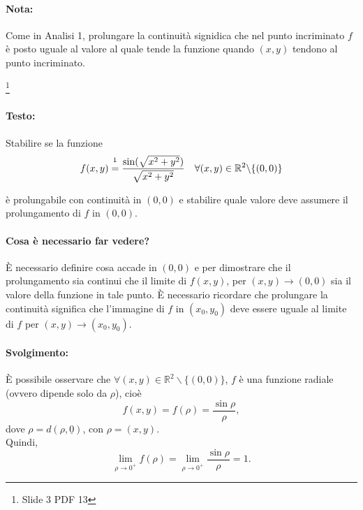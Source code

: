 \paragraph{Nota:} Come in Analisi 1, prolungare la continuità signidica che nel punto incriminato $f$ è posto uguale al valore al quale tende la funzione quando $(x, y)$ tendono al punto incriminato.

\begin{example}\footnote{Slide 3 PDF 13}
	\paragraph{Testo:} Stabilire se la funzione
	\begin{equation*}
		f(x,y) \overset{\footnotemark}{=} \frac{\sin(\sqrt{x^2+y^2})}{\sqrt{x^2+y^2}}\quad \forall(x,y)\in\mathbb{R}^2\backslash\{(0,0)\}
	\end{equation*}
	
	\noindent è prolungabile con continuità in $(0,0)$ e stabilire quale valore deve assumere il prolungamento di $f$ in $(0,0)$.
	\paragraph{Cosa è necessario far vedere?} È necessario definire cosa accade in $(0,0)$ e per dimostrare che il prolungamento sia continui che il limite di $f(x,y)$, per $(x,y)\rightarrow(0,0)$ sia il valore della funzione in tale punto. È necessario ricordare che prolungare la continuità significa che l'immagine di $f$ in $(x_0,y_0)$ deve essere uguale al limite di $f$ per $(x,y)\rightarrow(x_0,y_0)$.
	\paragraph{Svolgimento:} È possibile osservare che $\forall (x,y)\in\mathbb R^2\backslash\{(0,0)\}$, $f$ è una funzione radiale (ovvero dipende solo da $\rho$), cioè
	\begin{equation*}
		f(x,y)=f(\rho)=\frac{\sin\rho}{\rho},
	\end{equation*}
	dove $\rho = d(\rho , \underline{0})$, con $\rho=(x,y)$.\\
	Quindi,
	\begin{equation*}
		\lim_{\rho\rightarrow0^+} f(\rho)=\lim_{\rho\rightarrow 0^+} \frac{\sin\rho}{\rho}=1.
	\end{equation*}

\end{example}
